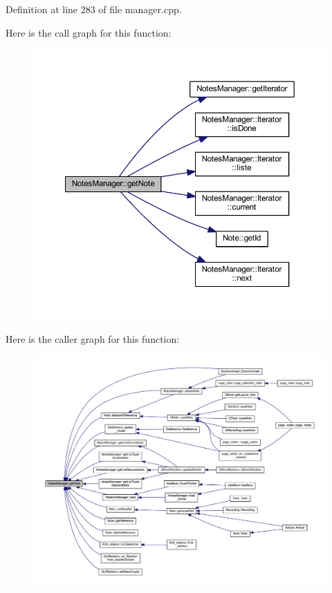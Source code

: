 Definition at line 283 of file manager.\+cpp.

Here is the call graph for this function\+:
\nopagebreak
\begin{figure}[H]
\begin{center}
\leavevmode
\includegraphics[width=350pt]{class_notes_manager_a9c401bfe7c91ab37a7c8c4db398e92ff_cgraph}
\end{center}
\end{figure}
Here is the caller graph for this function\+:
\nopagebreak
\begin{figure}[H]
\begin{center}
\leavevmode
\includegraphics[width=350pt]{class_notes_manager_a9c401bfe7c91ab37a7c8c4db398e92ff_icgraph}
\end{center}
\end{figure}
\mbox{\label{class_notes_manager_a0461145357fe17bf07c3b09c665b95db}} 
